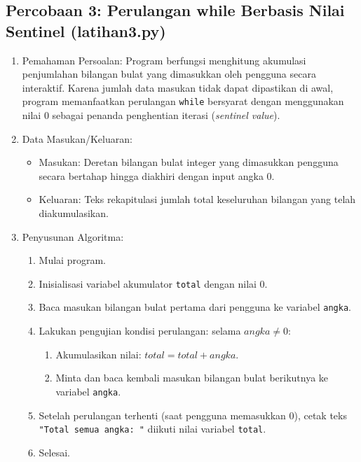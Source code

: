 \documentclass[12pt,a4paper]{article}
\begin{document}
\subsection{Percobaan 3: Perulangan while Berbasis Nilai Sentinel (latihan3.py)}
\begin{enumerate}
    \item Pemahaman Persoalan: Program berfungsi menghitung akumulasi penjumlahan bilangan bulat yang dimasukkan oleh pengguna secara interaktif. Karena jumlah data masukan tidak dapat dipastikan di awal, program memanfaatkan perulangan \texttt{while} bersyarat dengan menggunakan nilai $0$ sebagai penanda penghentian iterasi (\textit{sentinel value}).
    \item Data Masukan/Keluaran:
    \begin{itemize}
        \item Masukan: Deretan bilangan bulat integer yang dimasukkan pengguna secara bertahap hingga diakhiri dengan input angka 0.
        \item Keluaran: Teks rekapitulasi jumlah total keseluruhan bilangan yang telah diakumulasikan.
    \end{itemize}
    \item Penyusunan Algoritma:
    \begin{enumerate}[label=\alph*.]
        \item Mulai program.
        \item Inisialisasi variabel akumulator \texttt{total} dengan nilai 0.
        \item Baca masukan bilangan bulat pertama dari pengguna ke variabel \texttt{angka}.
        \item Lakukan pengujian kondisi perulangan: selama $angka \ne 0$:
        \begin{enumerate}[label=\roman*.]
            \item Akumulasikan nilai: $total = total + angka$.
            \item Minta dan baca kembali masukan bilangan bulat berikutnya ke variabel \texttt{angka}.
        \end{enumerate}
        \item Setelah perulangan terhenti (saat pengguna memasukkan 0), cetak teks \texttt{"Total semua angka: "} diikuti nilai variabel \texttt{total}.
        \item Selesai.
    \end{enumerate}
\end{enumerate}
\end{document}
